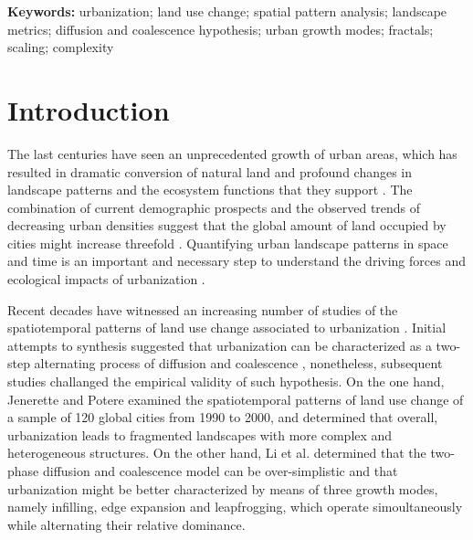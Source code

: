 \documentclass[10pt,letterpaper]{article}
\begin{document}
\textbf{Keywords:} urbanization; land use change; spatial pattern analysis; landscape metrics; diffusion and coalescence hypothesis; urban growth modes; fractals; scaling; complexity


\linenumbers

\section*{Introduction}

The last centuries have seen an unprecedented growth of urban areas, which has resulted in dramatic conversion of natural land and profound changes in landscape patterns and the ecosystem functions that they support \cite{alberti2005effects}. %
The combination of current demographic prospects and the observed trends of decreasing urban densities suggest that the global amount of land occupied by cities might increase threefold \cite{angel2005dynamics}.
Quantifying urban landscape patterns in space and time is an important and necessary step to understand the driving forces and ecological impacts of urbanization \cite{wu2014urban}. 

Recent decades have witnessed an increasing number of studies of the spatiotemporal patterns of land use change associated to urbanization \cite{dietzel2005spatio, seto2005quantifying, schneider2008compact, jenerette2010global, wu2011quantifying, li2013quantifying, liu2016general, nong2018quantifying}.
Initial attempts to synthesis suggested that urbanization can be characterized as a two-step alternating process of diffusion and coalescence \cite{dietzel2005spatio, schneider2008compact}, nonetheless, subsequent studies challanged the empirical validity of such hypothesis.
On the one hand, Jenerette and Potere \cite{jenerette2010global} examined the spatiotemporal patterns of land use change of a sample of 120 global cities from 1990 to 2000, and determined that overall, urbanization leads to fragmented landscapes with more complex and heterogeneous structures. On the other hand, Li et al. \cite{li2013quantifying} determined that the two-phase diffusion and coalescence model can be over-simplistic and that urbanization might be better characterized by means of three growth modes, namely infilling, edge expansion and leapfrogging, which operate simoultaneously while alternating their relative dominance.
\end{document}
